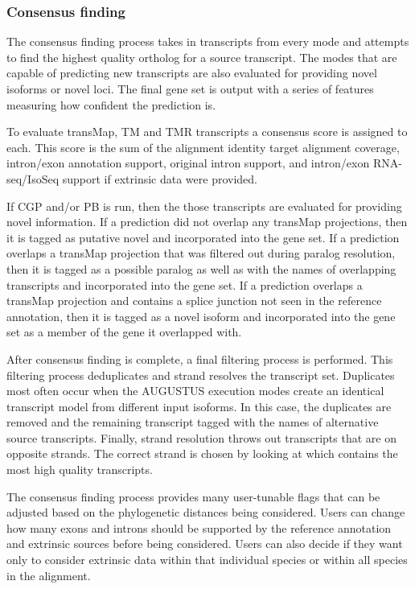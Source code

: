 \documentclass[fleqn,10pt]{wlscirep}
\begin{document}
\subsubsection{Consensus finding}
	The consensus finding process takes in transcripts from every mode and attempts to find the highest quality ortholog for a source transcript. The modes that are capable of predicting new transcripts are also evaluated for providing novel isoforms or novel loci. The final gene set is output with a series of features measuring how confident the prediction is.
    
	To evaluate transMap, TM and TMR transcripts a consensus score is assigned to each. This score is the sum of the alignment identity target alignment coverage, intron/exon annotation support, original intron support, and intron/exon RNA-seq/IsoSeq support if extrinsic data were provided.
    
	If CGP and/or PB is run, then the those transcripts are evaluated for providing novel information. If a prediction did not overlap any transMap projections, then it is tagged as putative novel and incorporated into the gene set. If a prediction overlaps a transMap projection that was filtered out during paralog resolution, then it is tagged as a possible paralog as well as with the names of overlapping transcripts and incorporated into the gene set. If a prediction overlaps a transMap projection and contains a splice junction not seen in the reference annotation, then it is tagged as a novel isoform and incorporated into the gene set as a member of the gene it overlapped with.
    
	After consensus finding is complete, a final filtering process is performed. This filtering process deduplicates and strand resolves the transcript set. Duplicates most often occur when the AUGUSTUS execution modes create an identical transcript model from different input isoforms. In this case, the duplicates are removed and the remaining transcript tagged with the names of alternative source transcripts. Finally, strand resolution throws out transcripts that are on opposite strands. The correct strand is chosen by looking at which contains the most high quality transcripts.
    
	The consensus finding process provides many user-tunable flags that can be adjusted based on the phylogenetic distances being considered. Users can change how many exons and introns should be supported by the reference annotation and extrinsic sources before being considered. Users can also decide if they want only to consider extrinsic data within that individual species or within all species in the alignment. 
\end{document}
